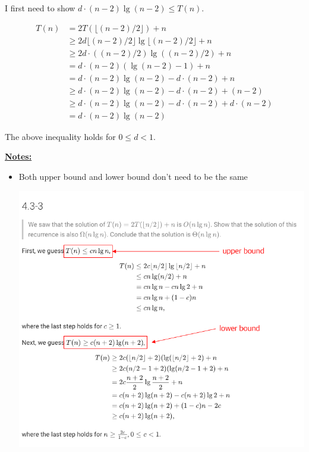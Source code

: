 \documentclass[12pt]{article}
\begin{document}
\begin{enumerate}[1.]
    \bigskip

    I first need to show $ d \cdot (n-2) \lg (n-2) \leq T(n)$.

    \bigskip

    \begin{align}
        T(n) &= 2T(\lfloor (n-2)/2 \rfloor) + n\\
        &\geq 2 d \lfloor (n-2)/2 \rfloor \lg \lfloor (n-2)/2 \rfloor + n\\
        &\geq 2 d \cdot ((n-2)/2) \lg ((n-2)/2) + n\\
        &= d \cdot (n-2) (\lg (n-2) - 1) + n\\
        &= d \cdot (n - 2) \lg (n - 2) - d \cdot (n - 2) + n\\
        &\geq d \cdot (n - 2) \lg (n - 2) - d \cdot (n - 2) + (n-2)\\
        &\geq d \cdot (n - 2) \lg (n - 2) - d \cdot (n - 2) + d \cdot (n-2)\\
        &= d \cdot (n - 2) \lg (n - 2)
    \end{align}

    \bigskip

    The above inequality holds for $0 \leq d < 1$.

    \bigskip

    \underline{\textbf{Notes:}}

    \bigskip

    \begin{itemize}
        \item Both upper bound and lower bound don't need to be the same

        \begin{center}
        \includegraphics[width=0.7\linewidth]{images/worksheet_0_solution_1.png}
        \end{center}
    \end{itemize}


\end{enumerate}
\end{document}
